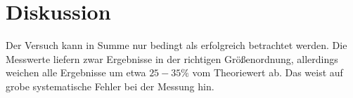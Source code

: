 \section{Diskussion}
\label{sec:Diskussion}

Der Versuch kann in Summe nur bedingt als erfolgreich betrachtet werden. Die Messwerte
liefern zwar Ergebnisse in der richtigen Größenordnung, allerdings weichen alle Ergebnisse um
etwa $25-35\%$ vom Theoriewert ab. Das weist auf grobe systematische Fehler bei der Messung hin.
